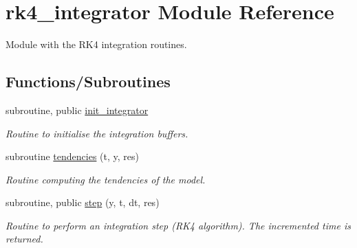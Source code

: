 \hypertarget{namespacerk4__integrator}{}\section{rk4\+\_\+integrator Module Reference}
\label{namespacerk4__integrator}


Module with the R\+K4 integration routines.  


\subsection*{Functions/\+Subroutines}
\begin{DoxyCompactItemize}
\item 
subroutine, public \hyperlink{namespacerk4__integrator_a51e9520d63269423a2341750219a7657}{init\+\_\+integrator}
\begin{DoxyCompactList}\small\item\em Routine to initialise the integration buffers. \end{DoxyCompactList}\item 
subroutine \hyperlink{namespacerk4__integrator_ad63cb6e7a042c91280e6d7d1dd8486aa}{tendencies} (t, y, res)
\begin{DoxyCompactList}\small\item\em Routine computing the tendencies of the model. \end{DoxyCompactList}\item 
subroutine, public \hyperlink{namespacerk4__integrator_a3599b8d3b64a4c1b04a859aa4454b32b}{step} (y, t, dt, res)
\begin{DoxyCompactList}\small\item\em Routine to perform an integration step (R\+K4 algorithm). The incremented time is returned. \end{DoxyCompactList}\end{DoxyCompactItemize}
